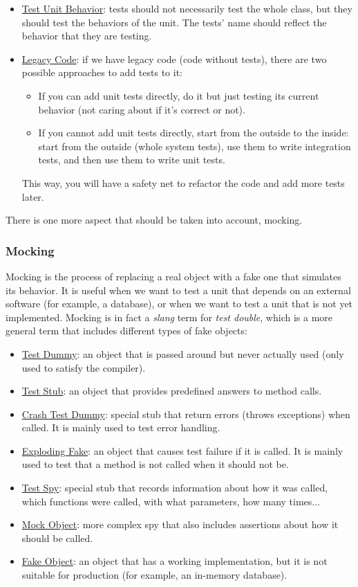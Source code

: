 \begin{itemize}
    \item \ul{Test Unit Behavior}: tests should not necessarily test the whole class, but they should test the behaviors of the unit. The tests' name should reflect the behavior that they are testing.
    \item \ul{Legacy Code}: if we have legacy code (code without tests), there are two possible approaches to add tests to it:
    \begin{itemize}
        \item If you can add unit tests directly, do it but just testing its current behavior (not caring about if it's correct or not).
        \item If you cannot add unit tests directly, start from the outside to the inside: start from the outside (whole system tests), use them to write integration tests, and then use them to write unit tests.
    \end{itemize}
    This way, you will have a safety net to refactor the code and add more tests later.
\end{itemize}

There is one more aspect that should be taken into account, mocking.
\subsubsection{Mocking}

Mocking is the process of replacing a real object with a fake one that simulates its behavior. It is useful when we want to test a unit that depends on an external software (for example, a database), or when we want to test a unit that is not yet implemented. Mocking is in fact a \emph{slang} term for \emph{test double}, which is a more general term that includes different types of fake objects:
\begin{itemize}
    \item \ul{Test Dummy}: an object that is passed around but never actually used (only used to satisfy the compiler).
    \item \ul{Test Stub}: an object that provides predefined answers to method calls.
    \item \ul{Crash Test Dummy}: special stub that return errors (throws exceptions) when called. It is mainly used to test error handling.
    \item \ul{Exploding Fake}: an object that causes test failure if it is called. It is mainly used to test that a method is not called when it should not be.
    \item \ul{Test Spy}: special stub that records information about how it was called, which functions were called, with what parameters, how many times... 
    \item \ul{Mock Object}: more complex spy that also includes assertions about how it should be called.
    \item \ul{Fake Object}: an object that has a working implementation, but it is not suitable for production (for example, an in-memory database).
\end{itemize}

